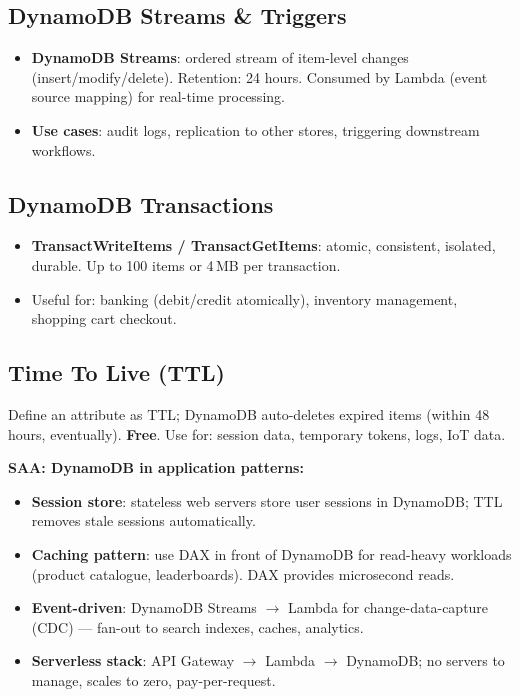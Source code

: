 \subsection{DynamoDB Streams \& Triggers}

\begin{itemize}
  \item \textbf{DynamoDB Streams}: ordered stream of item-level changes (insert/modify/delete).
        Retention: 24 hours. Consumed by Lambda (event source mapping) for real-time processing.
  \item \textbf{Use cases}: audit logs, replication to other stores, triggering downstream workflows.
\end{itemize}

\subsection{DynamoDB Transactions}

\begin{itemize}
  \item \textbf{TransactWriteItems / TransactGetItems}: atomic, consistent, isolated, durable.
        Up to 100 items or 4\,MB per transaction.
  \item Useful for: banking (debit/credit atomically), inventory management, shopping cart checkout.
\end{itemize}

\subsection{Time To Live (TTL)}

Define an attribute as TTL; DynamoDB auto-deletes expired items (within 48 hours, eventually).
\textbf{Free}. Use for: session data, temporary tokens, logs, IoT data.

\begin{saadepth}
\textbf{SAA: DynamoDB in application patterns:}
\begin{itemize}
  \item \textbf{Session store}: stateless web servers store user sessions in DynamoDB;
        TTL removes stale sessions automatically.
  \item \textbf{Caching pattern}: use DAX in front of DynamoDB for read-heavy workloads
        (product catalogue, leaderboards). DAX provides microsecond reads.
  \item \textbf{Event-driven}: DynamoDB Streams $\rightarrow$ Lambda for change-data-capture
        (CDC) --- fan-out to search indexes, caches, analytics.
  \item \textbf{Serverless stack}: API Gateway $\rightarrow$ Lambda $\rightarrow$ DynamoDB;
        no servers to manage, scales to zero, pay-per-request.
\end{itemize}
\end{saadepth}

